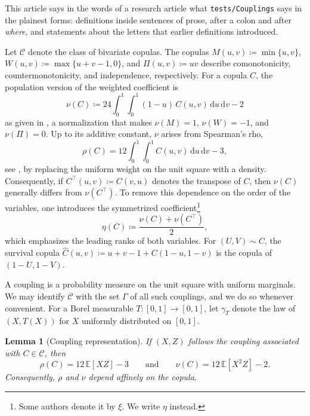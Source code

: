 \documentclass{article}
\newcommand{\E}{\mathbb{E}}
\newcommand{\CC}{\mathcal{C}}
\newcommand{\Gam}{\Gamma}
\newcommand{\de}{\,\mathrm{d}}
\newtheorem{lemma}[theorem]{Lemma}
\begin{document}
This article says in the words of a research article what \texttt{tests/Couplings} says in the plainest forms: definitions inside sentences of prose, after a colon and after \emph{where}, and statements about the letters that earlier definitions introduced.

Let $\CC$ denote the class of bivariate copulas.
The copulas $M(u,v)\coloneqq\min\{u,v\}$, $W(u,v)\coloneqq\max\{u+v-1,0\}$, and $\Pi(u,v)\coloneqq uv$ describe comonotonicity, countermonotonicity, and independence, respectively.
For a copula $C$, the population version of the weighted coefficient is
\begin{equation}
  \label{eq:nu-def}
  \nu(C)\coloneqq24\int_0^1\!\int_0^1(1-u)\,C(u,v)\de u\de v-2
\end{equation}
as given in \cite{genest}, a normalization that makes $\nu(M)=1$, $\nu(W)=-1$, and $\nu(\Pi)=0$.
Up to its additive constant, $\nu$ arises from Spearman's rho,
\begin{equation}
  \label{eq:rho-def}
  \rho(C)=12\int_0^1\!\int_0^1 C(u,v)\de u\de v-3,
\end{equation}
see \cite{nelsen}, by replacing the uniform weight on the unit square with a density.
Consequently, if $C^\top(u,v)\coloneqq C(v,u)$ denotes the transpose of $C$, then $\nu(C)$ generally differs from $\nu(C^\top)$.
To remove this dependence on the order of the variables, one introduces the symmetrized coefficient\footnote{Some authors denote it by $\xi$. We write $\eta$ instead.}
\begin{equation}
  \label{eq:eta-def}
  \eta(C)\coloneqq\frac{\nu(C)+\nu(C^\top)}{2},
\end{equation}
which emphasizes the leading ranks of both variables.
For $(U,V)\sim C$, the survival copula $\widehat C(u,v)\coloneqq u+v-1+C(1-u,1-v)$ is the copula of $(1-U,1-V)$.

A coupling is a probability measure on the unit square with uniform marginals.
We may identify $\CC$ with the set $\Gam$ of all such couplings, and we do so whenever convenient.
For a Borel measurable $T:[0,1]\to[0,1]$, let $\gamma_T$ denote the law of $(X,T(X))$ for $X$ uniformly distributed on $[0,1]$.

\begin{lemma}[Coupling representation]
\label{lem:coupling}
If $(X,Z)$ follows the coupling associated with $C\in\CC$, then
\begin{equation}
  \label{eq:moments}
  \rho(C)=12\,\E[XZ]-3
  \qquad\text{and}\qquad
  \nu(C)=12\,\E[X^2Z]-2.
\end{equation}
Consequently, $\rho$ and $\nu$ depend affinely on the copula.
\end{lemma}
\end{document}
